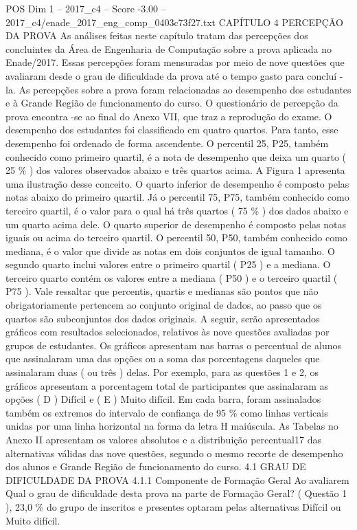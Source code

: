 \begin{textsample}{POS Dim 1 – 2017\_c4 – Score -3.00 – 2017\_c4/enade\_2017\_eng\_comp\_0403c73f27.txt}  \label{ex:f1_pos_276}
CAPÍTULO 4 PERCEPÇÃO DA PROVA As análises feitas neste capítulo tratam das percepções dos concluintes da Área de Engenharia de Computação sobre a prova aplicada no Enade/2017.
Essas percepções foram mensuradas por meio de nove questões que avaliaram desde o grau de dificuldade da prova até o tempo gasto para concluí -la.
As percepções sobre a prova foram relacionadas ao desempenho dos estudantes e à Grande Região de funcionamento do curso.
O questionário de percepção da prova encontra -se ao final do Anexo VII, que traz a reprodução do exame.
O desempenho dos estudantes foi classificado em quatro quartos.
Para tanto, esse desempenho foi ordenado de forma ascendente.
O percentil 25, P25, também conhecido como primeiro quartil, é a nota de desempenho que deixa um quarto ( 25 \% ) dos valores observados abaixo e três quartos acima.
A Figura 1 apresenta uma ilustração desse conceito.
O quarto inferior de desempenho é composto pelas notas abaixo do primeiro quartil.
Já o percentil 75, P75, também conhecido como terceiro quartil, é o valor para o qual há três quartos ( 75 \% ) dos dados abaixo e um quarto acima dele.
O quarto superior de desempenho é composto pelas notas iguais ou acima do terceiro quartil.
O percentil 50, P50, também conhecido como mediana, é o valor que divide as notas em dois conjuntos de igual tamanho.
O segundo quarto inclui valores entre o primeiro quartil ( P25 ) e a mediana.
O terceiro quarto contém os valores entre a mediana ( P50 ) e o terceiro quartil ( P75 ).
Vale ressaltar que percentis, quartis e medianas são pontos que não obrigatoriamente pertencem ao conjunto original de dados, ao passo que os quartos são subconjuntos dos dados originais.
A seguir, serão apresentados gráficos com resultados selecionados, relativos às nove questões avaliadas por grupos de estudantes.
Os gráficos apresentam nas barras o percentual de alunos que assinalaram uma das opções ou a soma das porcentagens daqueles que assinalaram duas ( ou três ) delas.
Por exemplo, para as questões 1 e 2, os gráficos apresentam a porcentagem total de participantes que assinalaram as opções ( D ) Difícil e ( E ) Muito difícil.
Em cada barra, foram assinalados também os extremos do intervalo de confiança de 95 \% como linhas verticais unidas por uma linha horizontal na forma da letra H maiúscula.
As Tabelas no Anexo II apresentam os valores absolutos e a distribuição percentual17 das alternativas válidas das nove questões, segundo o mesmo recorte de desempenho dos alunos e Grande Região de funcionamento do curso. 4.1 GRAU DE DIFICULDADE DA PROVA 4.1.1 Componente de Formação Geral Ao avaliarem Qual o grau de dificuldade desta prova na parte de Formação Geral? ( Questão 1 ), 23,0 \% do grupo de inscritos e presentes optaram pelas alternativas Difícil ou Muito difícil.

\end{textsample}
